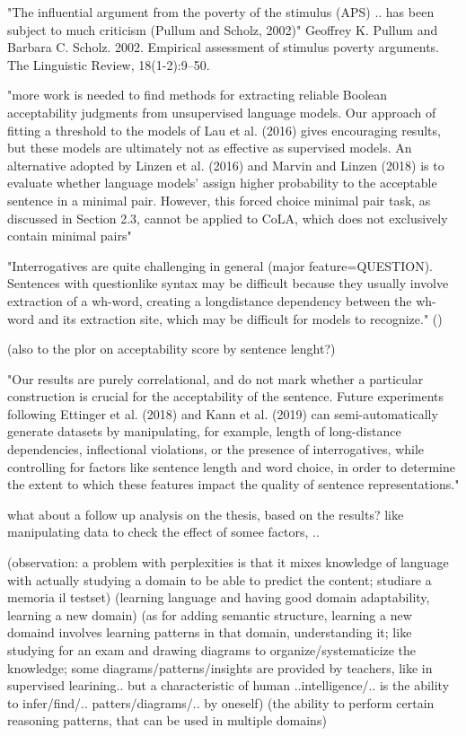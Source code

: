 "The influential argument from the poverty of the stimulus (APS) ..  has been subject to much
criticism (Pullum and Scholz, 2002)" 
Geoffrey K. Pullum and Barbara C. Scholz. 2002.
Empirical assessment of stimulus poverty arguments. The Linguistic Review, 18(1-2):9–50.

"more work is needed to
find methods for extracting reliable Boolean acceptability judgments from unsupervised language
models. Our approach of fitting a threshold to the
models of Lau et al. (2016) gives encouraging results, but these models are ultimately not as effective as supervised models. An alternative adopted
by Linzen et al. (2016) and Marvin and Linzen
(2018) is to evaluate whether language models’ assign higher probability to the acceptable sentence
in a minimal pair. However, this forced choice
minimal pair task, as discussed in Section 2.3, cannot be applied to CoLA, which does not exclusively contain minimal pairs"

"Interrogatives are quite challenging in general (major feature=QUESTION). Sentences with questionlike syntax may be difficult because they usually
involve extraction of a wh-word, creating a longdistance dependency between the wh-word and its
extraction site, which may be difficult for models
to recognize." ()

(also to the plor on acceptability score by sentence lenght?)

"Our results are purely
correlational, and do not mark whether a particular construction is crucial for the acceptability of
the sentence. Future experiments following Ettinger et al. (2018) and Kann et al. (2019) can
semi-automatically generate datasets by manipulating, for example, length of long-distance dependencies, inflectional violations, or the presence
of interrogatives, while controlling for factors like
sentence length and word choice, in order to determine the extent to which these features impact the
quality of sentence representations."

what about a follow up analysis on the thesis, based on the results? like manipulating data to check the effect of somee factors, ..

(observation: a problem with perplexities is that it mixes knowledge of language with actually studying a domain to be able to predict the content; studiare a memoria il testset)
(learning language and having good domain adaptability, learning a new domain)
(as for adding semantic structure, learning a new domaind involves learning patterns in that domain, understanding it; like studying for an exam and drawing diagrams to organize/systematicize the knowledge; some diagrams/patterns/insights are provided by teachers, like in supervised learining.. but a characteristic of human ..intelligence/.. is the ability to infer/find/.. patters/diagrams/.. by oneself)
(the ability to perform certain reasoning patterns, that can be used in multiple domains)

